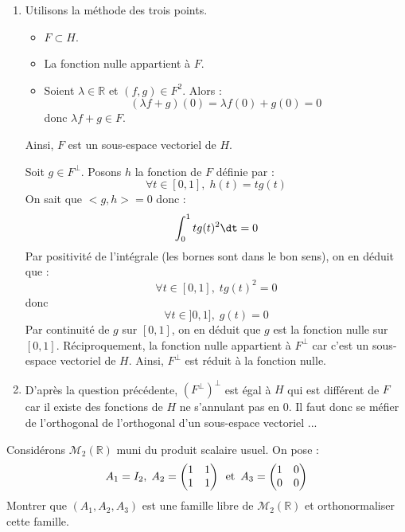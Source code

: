 \documentclass[a4paper,10pt]{report}
\begin{document}
\corr 

\begin{enumerate}
\item Utilisons la méthode des trois points.
\begin{itemize}
\item $F \subset H$.
\item La fonction nulle appartient à $F$.
\item Soient $\lambda \in \mathbb{R}$ et $(f,g) \in F^2$. Alors :
$$ (\lambda f+g)(0) = \lambda f(0)+g(0) = 0$$
donc $\lambda f+g \in F$.
\end{itemize}
Ainsi, $F$ est un sous-espace vectoriel de $H$.

\medskip

\noindent Soit $g \in F^{\perp}$. Posons $h$ la fonction de $F$ définie par :
$$ \forall t \in [0,1], \; h(t)=tg(t)$$
On sait que $<g,h>=0$ donc :
$$ \int_0^1 t g(t)^2 \dt =0$$
Par positivité de l'intégrale (les bornes sont dans le bon sens), on en déduit que :
$$ \forall t \in [0,1], \; t g(t)^2=0$$
donc 
$$ \forall t \in ]0,1], \; g(t)=0$$
Par continuité de $g$ sur $[0,1]$, on en déduit que $g$ est la fonction nulle sur $[0,1]$. Réciproquement, la fonction nulle appartient à $F^{\perp}$ car c'est un sous-espace vectoriel de $H$. Ainsi, $F^{\perp}$ est réduit à la fonction nulle.
\item D'après la question précédente, $(F^{\perp})^{\perp}$ est égal à $H$ qui est différent de $F$ car il existe des fonctions de $H$ ne s'annulant pas en $0$. Il faut donc se méfier de l'orthogonal de l'orthogonal d'un sous-espace vectoriel ...
\end{enumerate}

\begin{Exercice}{} Considérons $\mathcal{M}_2(\mathbb{R})$ muni du produit scalaire usuel. On pose :
$$A_1 = I_2, \; A_2 = \begin{pmatrix}
1 & 1 \\
1 & 1 \\
\end{pmatrix} \, \hbox{ et } \, A_3 = \begin{pmatrix}
1 & 0 \\
0 & 0
\end{pmatrix}$$
Montrer que $(A_1,A_2,A_3)$ est une famille libre de $\mathcal{M}_2(\mathbb{R})$ et orthonormaliser cette famille.
\end{Exercice}
\end{document}
